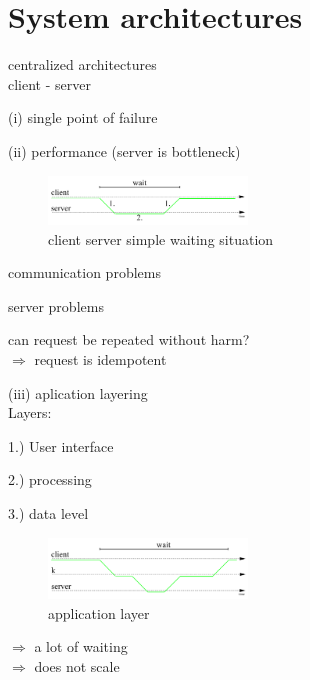 \documentclass[ngerman,a4paper]{report}
\begin{document}
\section{System architectures}
\begin{compactenum}
\item centralized architectures\\
client - server\\
\begin{compactitem}
\item[(i)] single point of failure
\item[(ii)] performance (server is bottleneck)\\
\begin{figure}[h]
	\centering
	\includegraphics[width=200px]{gfx/cs_simple_wait.png}
	\caption{client server simple waiting situation}
	\label{img:cs_simple_wait}
\end{figure}
\begin{compactenum}
\item communication problems\\
\item server problems\\
\end{compactenum}
can request be repeated without harm?\\
$\Rightarrow$ request is idempotent
\item[(iii)] aplication layering\\
Layers:\begin{compactitem}
\item[1.)] User interface
\item[2.)] processing
\item[3.)] data level
\begin{figure}[h]
	\centering
	\includegraphics[width=200px]{gfx/cs_app_layer.png}
	\caption{application layer}
	\label{img:cs_app_layer}
\end{figure}
\end{compactitem}
$\Rightarrow$ a lot of waiting\\
$\Rightarrow$ does not scale\\

\end{compactitem}
\end{compactenum}
\end{document}
